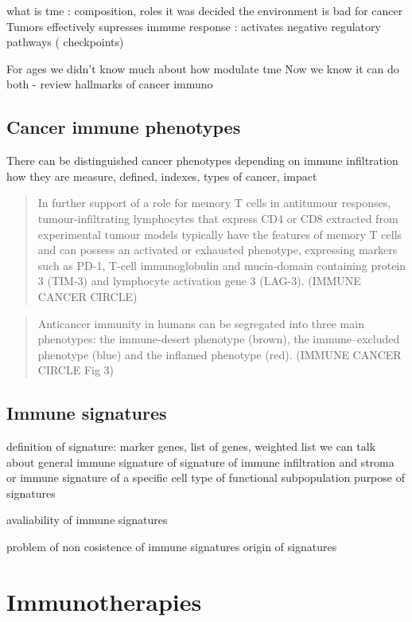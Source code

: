 \documentclass[12pt,]{book}
\theoremstyle{definition}
\theoremstyle{definition}
\theoremstyle{definition}
\theoremstyle{remark}
\begin{document}
what is tme : composition, roles it was decided the environment is bad
for cancer Tumors effectively supresses immune response : activates
negative regulatory pathways ( checkpoints)

For ages we didn't know much about how modulate tme Now we know it can
do both - review hallmarks of cancer immuno

\hypertarget{cancer-immune-phenotypes}{%
\subsection{Cancer immune phenotypes}\label{cancer-immune-phenotypes}}

There can be distinguished cancer phenotypes depending on immune
infiltration how they are measure, defined, indexes, types of cancer,
impact

\begin{quote}
In further support of a role for memory T cells in antitumour responses,
tumour-infiltrating lymphocytes that express CD4 or CD8 extracted from
experimental tumour models typically have the features of memory T cells
and can possess an activated or exhausted phenotype, expressing markers
such as PD-1, T-cell immunoglobulin and mucin-domain containing protein
3 (TIM-3) and lymphocyte activation gene 3 (LAG-3). (IMMUNE CANCER
CIRCLE)
\end{quote}

\begin{quote}
Anticancer immunity in humans can be segregated into three main
phenotypes: the immune-desert phenotype (brown), the immune--excluded
phenotype (blue) and the inflamed phenotype (red). (IMMUNE CANCER CIRCLE
Fig 3)
\end{quote}

\hypertarget{immune-signatures}{%
\subsection{Immune signatures}\label{immune-signatures}}

definition of signature: marker genes, list of genes, weighted list we
can talk about general immune signature of signature of immune
infiltration and stroma or immune signature of a specific cell type of
functional subpopulation purpose of signatures

avaliability of immune signatures

problem of non cosistence of immune signatures origin of signatures

\hypertarget{immunotherapies}{%
\section{Immunotherapies}\label{immunotherapies}}
\end{document}
